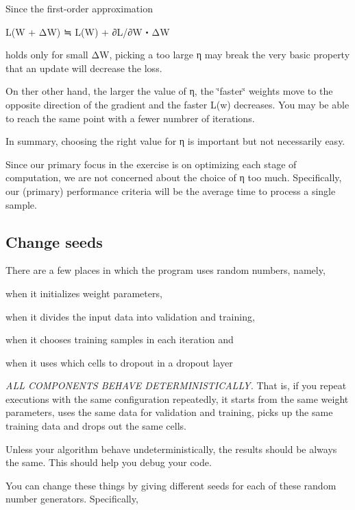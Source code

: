 Since the first-\/order approximation \begin{DoxyVerb}L(W + ΔW) ≒ L(W) + ∂L/∂W・ΔW
\end{DoxyVerb}


holds only for small ΔW, picking a too large η may break the very basic property that an update will decrease the loss.

On ther other hand, the larger the value of η, the \char`\"{}faster\char`\"{} weights move to the opposite direction of the gradient and the faster L(w) decreases. You may be able to reach the same point with a fewer numbrer of iterations.

In summary, choosing the right value for η is important but not necessarily easy.

Since our primary focus in the exercise is on optimizing each stage of computation, we are not concerned about the choice of η too much. Specifically, our (primary) performance criteria will be the average time to process a single sample.

\subsection*{Change seeds }

There are a few places in which the program uses random numbers, namely,


\begin{DoxyItemize}
\item when it initializes weight parameters,
\item when it divides the input data into validation and training,
\item when it chooses training samples in each iteration and
\item when it uses which cells to dropout in a dropout layer
\end{DoxyItemize}

{\itshape A\+LL C\+O\+M\+P\+O\+N\+E\+N\+TS B\+E\+H\+A\+VE D\+E\+T\+E\+R\+M\+I\+N\+I\+S\+T\+I\+C\+A\+L\+LY.} That is, if you repeat executions with the same configuration repeatedly, it starts from the same weight parameters, uses the same data for validation and training, picks up the same training data and drops out the same cells.

Unless your algorithm behave undeterministically, the results should be always the same. This should help you debug your code.

You can change these things by giving different seeds for each of these random number generators. Specifically,



